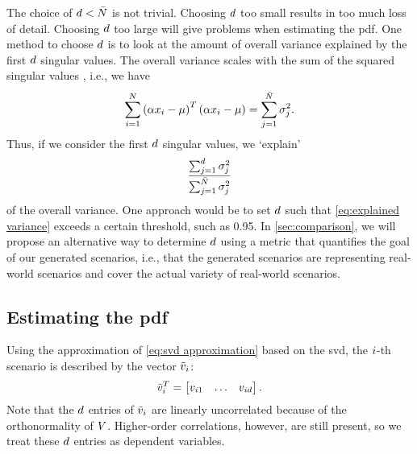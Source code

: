 The choice of $d < \bar{N}$ is not trivial.
Choosing $d$ too small results in too much loss of detail.
Choosing $d$ too large will give problems when estimating the \ac{pdf}.
One method to choose $d$ is to look at the amount of overall variance explained by the first $d$ singular values.
The overall variance scales with the sum of the squared singular values \autocite[p.~77]{golub2013matrix}, i.e., we have
\begin{equation}
	\sum_{i=1}^{N} \left( \alpha x_{i}-\mu \right)^T \left( \alpha x_{i}-\mu \right) 
	= \sum_{j=1}^{\bar{N}} \sigma_{j}^2.
\end{equation}
Thus, if we consider the first $d$ singular values, we `explain' 
\begin{equation}
	\label{eq:explained variance}
	\frac{\sum_{j=1}^{d} \sigma_{j}^2}{\sum_{j=1}^{\bar{N}} \sigma_{j}^2}
\end{equation}
of the overall variance.
One approach would be to set $d$ such that \cref{eq:explained variance} exceeds a certain threshold, such as 0.95.
In \cref{sec:comparison}, we will propose an alternative way to determine $d$ using a metric that quantifies the goal of our generated scenarios, i.e., that the generated scenarios are representing real-world scenarios and cover the actual variety of real-world scenarios.



\subsection{Estimating the \acl{pdf}}
\label{sec:kde}

Using the approximation of \cref{eq:svd approximation} based on the \ac{svd}, the $i$-th scenario is described by the vector $\tilde{v}_{i}$:
\begin{equation}
	\tilde{v}_{i}^T = \begin{bmatrix}
		v_{i 1} & \ldots & v_{i d}
	\end{bmatrix}.
\end{equation}
Note that the $d$ entries of $\tilde{v}_{i}$ are linearly uncorrelated because of the orthonormality of $V$.
Higher-order correlations, however, are still present, so we treat these $d$ entries as dependent variables.


